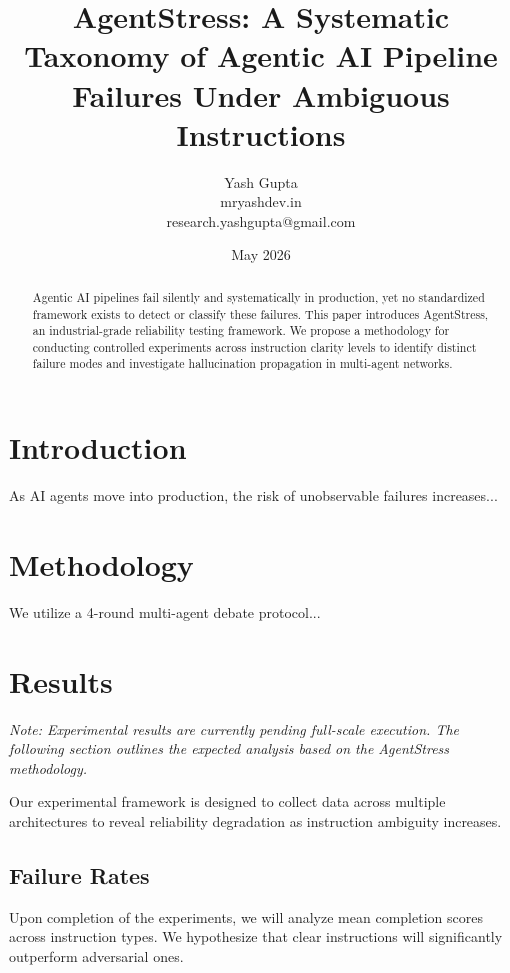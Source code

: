 \documentclass[11pt,a4paper]{article}
\title{AgentStress: A Systematic Taxonomy of Agentic AI Pipeline Failures Under Ambiguous Instructions}
\author{Yash Gupta \\ mryashdev.in \\ research.yashgupta@gmail.com}
\date{May 2026}
\begin{document}
\maketitle

\begin{abstract}
Agentic AI pipelines fail silently and systematically in production, yet no standardized framework exists to detect or classify these failures. This paper introduces AgentStress, an industrial-grade reliability testing framework. We propose a methodology for conducting controlled experiments across instruction clarity levels to identify distinct failure modes and investigate hallucination propagation in multi-agent networks.
\end{abstract}

\section{Introduction}
As AI agents move into production, the risk of unobservable failures increases...

\section{Methodology}
We utilize a 4-round multi-agent debate protocol...

\section{Results}
\textit{Note: Experimental results are currently pending full-scale execution. The following section outlines the expected analysis based on the AgentStress methodology.}

Our experimental framework is designed to collect data across multiple architectures to reveal reliability degradation as instruction ambiguity increases.

\subsection{Failure Rates}
Upon completion of the experiments, we will analyze mean completion scores across instruction types. We hypothesize that clear instructions will significantly outperform adversarial ones.

\end{document}
